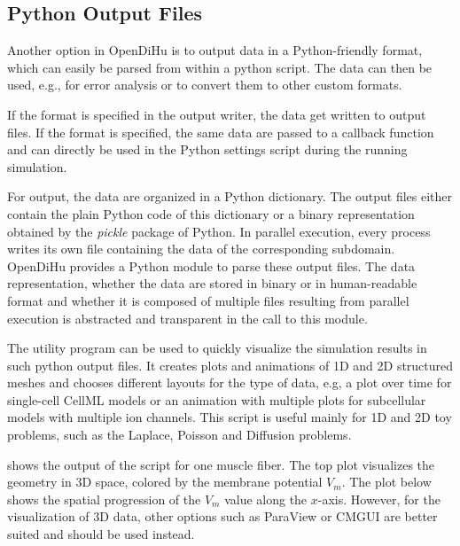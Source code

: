 \subsection{Python Output Files}
Another option in OpenDiHu is to output data in a Python-friendly format, which can easily be parsed from within a python script.
The data can then be used, e.g., for error analysis or to convert them to other custom formats.

If the format  is specified in the output writer, the data get written to output files. If the format  is specified, the same data are passed to a callback function and can directly be used in the Python settings script during the running simulation. 

For output, the data are organized in a Python dictionary. The output files either contain the plain Python code of this dictionary or a binary representation obtained by the \emph{pickle} package of Python. In parallel execution, every process writes its own file containing the data of the corresponding subdomain. OpenDiHu provides a Python module to parse these output files. The data representation, whether the data are stored in binary or in human-readable format and whether it is composed of multiple files resulting from parallel execution is abstracted and transparent in the call to this module.

The utility program  can be used to quickly visualize the simulation results in such python output files. It creates plots and animations of 1D and 2D structured meshes and chooses different layouts for the type of data, e.g, a plot over time for single-cell CellML models or an animation with multiple plots for subcellular models with multiple ion channels. This script is useful mainly for 1D and 2D toy problems, such as the Laplace, Poisson and Diffusion problems.

 shows the output of the  script for one muscle fiber. The top plot visualizes the geometry in 3D space, colored by the membrane potential $V_m$. The plot below shows the spatial progression of the $V_m$ value along the $x$-axis. However, for the visualization of 3D data, other options such as ParaView or CMGUI are better suited and should be used instead.

